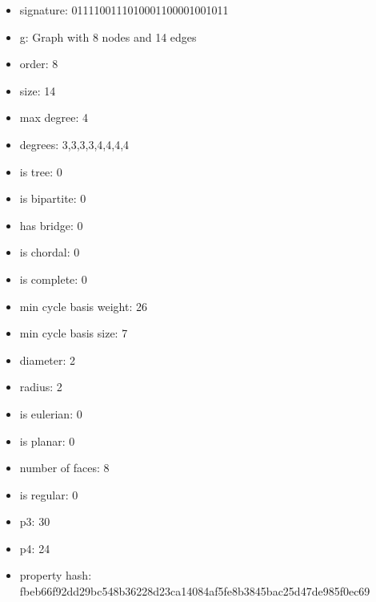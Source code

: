 \begin{itemize}
\item signature: 0111100111010001100001001011
\item g: Graph with 8 nodes and 14 edges
\item order: 8
\item size: 14
\item max degree: 4
\item degrees: 3,3,3,3,4,4,4,4
\item is tree: 0
\item is bipartite: 0
\item has bridge: 0
\item is chordal: 0
\item is complete: 0
\item min cycle basis weight: 26
\item min cycle basis size: 7
\item diameter: 2
\item radius: 2
\item is eulerian: 0
\item is planar: 0
\item number of faces: 8
\item is regular: 0
\item p3: 30
\item p4: 24
\item property hash: fbeb66f92dd29bc548b36228d23ca14084af5fe8b3845bac25d47de985f0ec69
\end{itemize}
\newpage
\begin{figure}
\end{figure}
